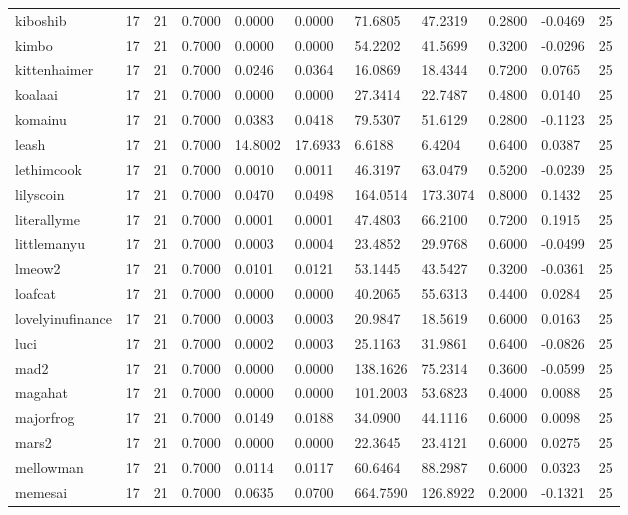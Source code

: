 \begin{table}[htbp]
\begin{tabular}{lllllllllll}
kiboshib & 17 & 21 & 0.7000 & 0.0000 & 0.0000 & 71.6805 & 47.2319 & 0.2800 & -0.0469 & 25 \\
kimbo & 17 & 21 & 0.7000 & 0.0000 & 0.0000 & 54.2202 & 41.5699 & 0.3200 & -0.0296 & 25 \\
kittenhaimer & 17 & 21 & 0.7000 & 0.0246 & 0.0364 & 16.0869 & 18.4344 & 0.7200 & 0.0765 & 25 \\
koalaai & 17 & 21 & 0.7000 & 0.0000 & 0.0000 & 27.3414 & 22.7487 & 0.4800 & 0.0140 & 25 \\
komainu & 17 & 21 & 0.7000 & 0.0383 & 0.0418 & 79.5307 & 51.6129 & 0.2800 & -0.1123 & 25 \\
leash & 17 & 21 & 0.7000 & 14.8002 & 17.6933 & 6.6188 & 6.4204 & 0.6400 & 0.0387 & 25 \\
lethimcook & 17 & 21 & 0.7000 & 0.0010 & 0.0011 & 46.3197 & 63.0479 & 0.5200 & -0.0239 & 25 \\
lilyscoin & 17 & 21 & 0.7000 & 0.0470 & 0.0498 & 164.0514 & 173.3074 & 0.8000 & 0.1432 & 25 \\
literallyme & 17 & 21 & 0.7000 & 0.0001 & 0.0001 & 47.4803 & 66.2100 & 0.7200 & 0.1915 & 25 \\
littlemanyu & 17 & 21 & 0.7000 & 0.0003 & 0.0004 & 23.4852 & 29.9768 & 0.6000 & -0.0499 & 25 \\
lmeow2 & 17 & 21 & 0.7000 & 0.0101 & 0.0121 & 53.1445 & 43.5427 & 0.3200 & -0.0361 & 25 \\
loafcat & 17 & 21 & 0.7000 & 0.0000 & 0.0000 & 40.2065 & 55.6313 & 0.4400 & 0.0284 & 25 \\
lovelyinufinance & 17 & 21 & 0.7000 & 0.0003 & 0.0003 & 20.9847 & 18.5619 & 0.6000 & 0.0163 & 25 \\
luci & 17 & 21 & 0.7000 & 0.0002 & 0.0003 & 25.1163 & 31.9861 & 0.6400 & -0.0826 & 25 \\
mad2 & 17 & 21 & 0.7000 & 0.0000 & 0.0000 & 138.1626 & 75.2314 & 0.3600 & -0.0599 & 25 \\
magahat & 17 & 21 & 0.7000 & 0.0000 & 0.0000 & 101.2003 & 53.6823 & 0.4000 & 0.0088 & 25 \\
majorfrog & 17 & 21 & 0.7000 & 0.0149 & 0.0188 & 34.0900 & 44.1116 & 0.6000 & 0.0098 & 25 \\
mars2 & 17 & 21 & 0.7000 & 0.0000 & 0.0000 & 22.3645 & 23.4121 & 0.6000 & 0.0275 & 25 \\
mellowman & 17 & 21 & 0.7000 & 0.0114 & 0.0117 & 60.6464 & 88.2987 & 0.6000 & 0.0323 & 25 \\
memesai & 17 & 21 & 0.7000 & 0.0635 & 0.0700 & 664.7590 & 126.8922 & 0.2000 & -0.1321 & 25 \\

\end{tabular}
\end{table}
